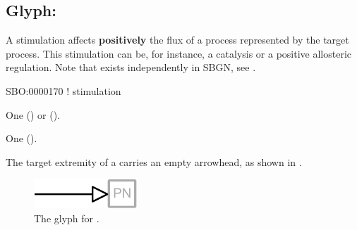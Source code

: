 \subsection{Glyph: }
\label{sec:stimulation}

A stimulation affects \textbf{positively} the flux of a process represented by the target process.
This stimulation can be, for instance, a catalysis or a positive allosteric regulation. Note that  exists independently in SBGN, see .

\begin{glyphDescription}

\glyphSboTerm
SBO:0000170 ! stimulation

\glyphOrigin
One  () or   ().

\glyphTarget
One  ().

\glyphSymbol
The target extremity of a  carries an empty arrowhead, as shown in .

\end{glyphDescription}

\begin{figure}[H]
  \centering
  \includegraphics{images/stimulation}
  \caption{The \PD glyph for .}
  \label{fig:stimulation}
\end{figure}
